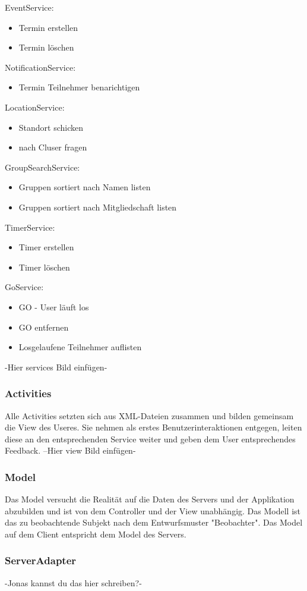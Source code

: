 \documentclass{scrartcl}
\begin{document}
EventService:
\begin{itemize}
\item Termin erstellen
\item Termin löschen
\end{itemize}
NotificationService:
\begin{itemize}
\item Termin Teilnehmer benarichtigen
\end{itemize}
LocationService:
\begin{itemize}
\item Standort schicken
\item nach Cluser fragen
\end{itemize}
GroupSearchService:
\begin{itemize}
\item Gruppen sortiert nach Namen listen
\item Gruppen sortiert nach Mitgliedschaft listen
\end{itemize}
TimerService:
\begin{itemize}
\item Timer erstellen
\item Timer löschen
\end{itemize}
GoService:
\begin{itemize}
\item GO - User läuft los
\item GO entfernen
\item Losgelaufene Teilnehmer auflisten
\end{itemize}
-Hier services Bild einfügen-

	\subsubsection{Activities}
	Alle Activities setzten sich aus XML-Dateien zusammen und bilden gemeinsam die View des Useres.
Sie nehmen als erstes Benutzerinteraktionen entgegen, leiten diese an den entsprechenden Service weiter und geben dem User entsprechendes Feedback.
	--Hier view Bild einfügen-
	\subsubsection{Model}
Das Model versucht die Realität auf die Daten des Servers und der Applikation abzubilden und ist von dem Controller und der View unabhängig. Das Modell ist das zu beobachtende Subjekt nach dem Entwurfsmuster "Beobachter".
Das Model auf dem Client entspricht dem Model des Servers.
	\subsubsection{ServerAdapter}
-Jonas kannst du das hier schreiben?-
	\newpage
\end{document}
